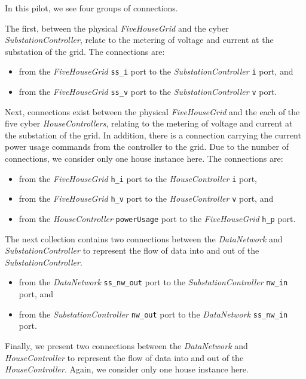 In this pilot, we see four groups of connections.

The first, between the physical \emph{FiveHouseGrid} and the cyber \emph{SubstationController}, relate to the metering of voltage and current at the substation of the grid. The connections are:

\begin{itemize}
  \item from the \emph{FiveHouseGrid} \texttt{ss\_i} port to the \emph{SubstationController} \texttt{i} port, and
  \item from the \emph{FiveHouseGrid}  \texttt{ss\_v} port to the \emph{SubstationController} \texttt{v} port.
\end{itemize}

Next, connections exist between the physical \emph{FiveHouseGrid} and the each of the five cyber \emph{HouseControllers}, relating to the metering of voltage and current at the substation of the grid. In addition, there is a connection carrying the current power usage commands from the controller to the grid. Due to the number of connections, we consider only one house instance here. The connections are:

\begin{itemize}
  \item from the \emph{FiveHouseGrid} \texttt{h\_i} port to the \emph{HouseController} \texttt{i} port, 
  \item from the \emph{FiveHouseGrid} \texttt{h\_v} port to the \emph{HouseController} \texttt{v} port, and
  \item from the \emph{HouseController}  \texttt{powerUsage} port to the \emph{FiveHouseGrid} \texttt{h\_p} port.
\end{itemize}

The next collection contains two connections between the \emph{DataNetwork} and \emph{SubstationController} to represent the flow of data into and out of the \emph{SubstationController}.

\begin{itemize}
  \item from the \emph{DataNetwork} \texttt{ss\_nw\_out} port to the \emph{SubstationController} \texttt{nw\_in} port, and
  \item from the \emph{SubstationController}  \texttt{nw\_out} port to the \emph{DataNetwork} \texttt{ss\_nw\_in} port.
\end{itemize}

Finally, we present two connections between the \emph{DataNetwork} and \emph{HouseController} to represent the flow of data into and out of the \emph{HouseController}. Again, we consider only one house instance here.

